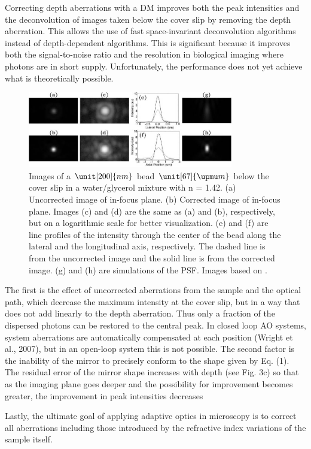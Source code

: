Correcting depth aberrations with a DM improves both the peak intensities and 
the deconvolution of images taken below the cover slip by removing the depth 
aberration. This allows the use of fast space-invariant deconvolution 
algorithms instead of depth-dependent algorithms. This is significant because 
it improves both the signal-to-noise ratio and the resolution in biological 
imaging where photons are in short supply. Unfortunately, the performance 
does not yet achieve what is theoretically possible.

\begin{figure}[htb]
	\centering
		\includegraphics[width=0.80\textwidth]{images/wide_flour_spher_All.jpg}
	\caption{Images of a $\unit[200]{nm}$ bead $\unit[67]{\upmu m}$ below the 
cover slip in a water/glycerol mixture with n = 1.42.  (a) Uncorrected image 
of in-focus plane. (b) Corrected image of in-focus plane. Images (c) and (d) 
are the same as (a) and (b), respectively, but on a logarithmic scale for 
better visualization. (e) and (f) are line profiles of the intensity through 
the center of the bead along the lateral and the longitudinal axis, 
respectively. The dashed line is from the uncorrected image and the solid 
line is from the corrected image. (g) and (h) are simulations of the PSF. 
Images based on \cite{wide_AOM_FM_spehrical_correction}.}
	\label{fig:wide_flour_spher_All} 
\end{figure}


The first is the effect of uncorrected aberrations from the sample and the 
optical path, which decrease the maximum intensity at the cover slip, but in 
a way that does not add linearly to the depth aberration. Thus only a 
fraction of the dispersed photons can be restored to the central peak. In 
closed loop AO systems, system aberrations are automatically compensated at 
each position (Wright et al., 2007), but in an open-loop system this is not 
possible. The second factor is the inability of the mirror to precisely 
conform to the shape given by Eq. (1). The residual error of the mirror shape 
increases with depth (see Fig. 3c) so that as the imaging plane goes deeper 
and the possibility for improvement becomes greater, the improvement in peak 
intensities decreases

Lastly, the ultimate goal of applying adaptive optics in microscopy is to 
correct all aberrations including those introduced by the refractive index 
variations of the sample itself.
\cite{wide_AOM_FM_spehrical_correction}
